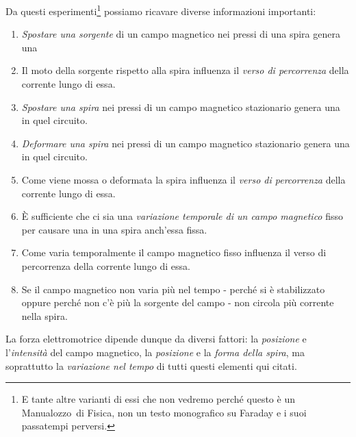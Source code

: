 Da questi esperimenti\footnote{E tante altre varianti di essi che non vedremo perché questo è un Manualozzo\texttrademark\ di Fisica, non un testo monografico su Faraday e i suoi passatempi perversi.} possiamo ricavare diverse informazioni importanti:
\begin{enumerate}[label=\alph*)]\label{osservazioniFaraday}
	\item \textit{Spostare una sorgente} di un campo magnetico nei pressi di una spira genera una \fem
	\item Il moto della sorgente rispetto alla spira influenza il \textit{verso di percorrenza} della corrente lungo di essa.
	\item \textit{Spostare una spira} nei pressi di un campo magnetico stazionario genera una \fem in quel circuito.
	\item \textit{Deformare una spira} nei pressi di un campo magnetico stazionario genera una \fem in quel circuito.
	\item Come viene mossa o deformata la spira influenza il \textit{verso di percorrenza} della corrente lungo di essa.
	\item È sufficiente che ci sia una \textit{variazione temporale di un campo magnetico} fisso per causare una \fem in una spira anch'essa fissa.
	\item Come varia temporalmente il campo magnetico fisso influenza il verso di percorrenza della corrente lungo di essa.
	\item Se il campo magnetico non varia più nel tempo - perché si è stabilizzato oppure perché non c'è più la sorgente del campo - non circola più corrente nella spira.
\end{enumerate}
La forza elettromotrice dipende dunque da diversi fattori: la \textit{posizione} e l'\textit{intensità} del campo magnetico, la \textit{posizione} e la \textit{forma della spira}, ma soprattutto la \textit{variazione nel tempo} di tutti questi elementi qui citati.

